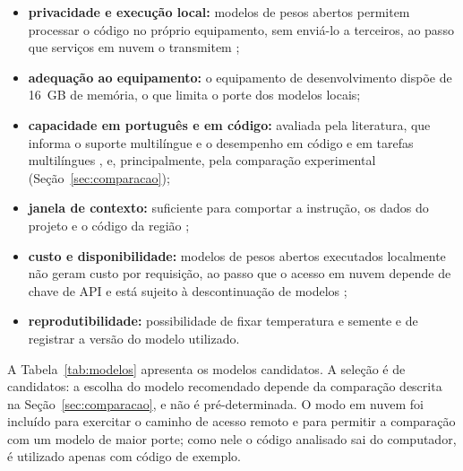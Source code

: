 \documentclass[
    12pt,                   %
    openright,              %
    oneside,                %
    a4paper,                %
    sumario=tradicional,    %
    english,                %
    brazil,                 %
    ]{abntex2}
\begin{document}
\begin{itemize}
  \item \textbf{privacidade e execução local:} modelos de pesos abertos permitem processar o código no próprio equipamento, sem enviá-lo a terceiros, ao passo que serviços em nuvem o transmitem \cite{ollama2026nuvem};
  \item \textbf{adequação ao equipamento:} o equipamento de desenvolvimento dispõe de 16~GB de memória, o que limita o porte dos modelos locais;
  \item \textbf{capacidade em português e em código:} avaliada pela literatura, que informa o suporte multilíngue \cite{yang2025qwen3} e o desempenho em código e em tarefas multilíngues \cite{bi2025gptoss}, e, principalmente, pela comparação experimental (Seção~\ref{sec:comparacao});
  \item \textbf{janela de contexto:} suficiente para comportar a instrução, os dados do projeto e o código da região \cite{ollama2026qwen3,ollama2026gemma4};
  \item \textbf{custo e disponibilidade:} modelos de pesos abertos executados localmente não geram custo por requisição, ao passo que o acesso em nuvem depende de chave de API e está sujeito à descontinuação de modelos \cite{ollama2026nuvem};
  \item \textbf{reprodutibilidade:} possibilidade de fixar temperatura e semente e de registrar a versão do modelo utilizado.
\end{itemize}

A Tabela~\ref{tab:modelos} apresenta os modelos candidatos. A seleção é de candidatos: a escolha do modelo recomendado depende da comparação descrita na Seção~\ref{sec:comparacao}, e não é pré-determinada. O modo em nuvem foi incluído para exercitar o caminho de acesso remoto e para permitir a comparação com um modelo de maior porte; como nele o código analisado sai do computador, é utilizado apenas com código de exemplo.
\end{document}
